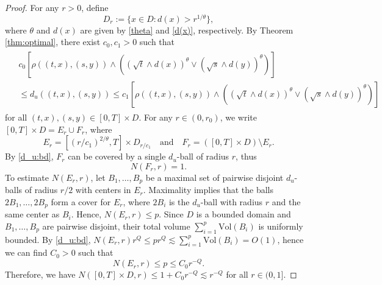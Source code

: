\documentclass[reqno]{amsart}
\newcommand{\1}{\mathbf 1}
\numberwithin{equation}{section}
\theoremstyle{definition}
\begin{document}
\begin{proof}
For any $r>0$, define
\[
	D_{r} := \{ x \in D: d(x) > r^{1/\theta} \},
\]
where $\theta$ and $d(x)$ are given by \eqref{theta} and \eqref{d(x)}, respectively.
By Theorem \ref{thm:optimal}, there exist $c_0,c_1>0$ such that
\begin{align}\begin{split}\label{d_u:bd}
	&c_0 \left[ \rho((t,x),(s,y)) \wedge \left( (\sqrt{t} \wedge d(x))^\theta \vee (\sqrt{s} \wedge d(y))^\theta \right) \right]\\
	&\le d_u((t,x),(s,y)) \le c_1 \left[ \rho((t,x),(s,y)) \wedge  \left( (\sqrt{t} \wedge d(x))^\theta \vee (\sqrt{s} \wedge d(y))^\theta \right)  \right]
\end{split}\end{align}
for all $(t,x), (s,y) \in [0,T] \times D$.
For any $r \in (0,r_0)$, we write $[0,T]\times D = E_r \cup F_r$, where
\[
	E_r = [(r/c_1)^{2/\theta}, T] \times D_{r/c_1} \quad \text{and} \quad 
	F_r = ([0,T]\times D) \setminus E_r.
\]
By \eqref{d_u:bd}, $F_r$ can be covered by a single $d_u$-ball of radius $r$, thus \[
	N(F_r, r) = 1.
\]
To estimate $N(E_r,r)$, let $B_1,\dots, B_p$ be a maximal set of pairwise disjoint $d_u$-balls of radius $r/2$ with centers in $E_r$. 
Maximality implies that the balls $2B_1,\dots, 2B_p$ form a cover for $E_r$, where $2B_i$ is the $d_u$-ball with radius $r$ and the same center as $B_i$.
Hence, $N(E_r,r) \le p$.
Since $D$ is a bounded domain and $B_1,\dots, B_p$ are pairwise disjoint, their total volume $\sum_{i=1}^p \mathrm{Vol}(B_i)$ is uniformly bounded.
By \eqref{d_u:bd}, $N(E_r,r) r^Q \le p r^Q\lesssim \sum_{i=1}^p \mathrm{Vol}(B_i) = O(1)$, hence we can find $C_0>0$ such that
\[
	N(E_r,r) \le p \le C_0 r^{-Q}.
\]
Therefore, we have $N([0,T]\times D, r) \le 1 + C_0 r^{-Q} \lesssim r^{-Q}$ for all $r \in (0,1]$.
\end{proof}
\end{document}
